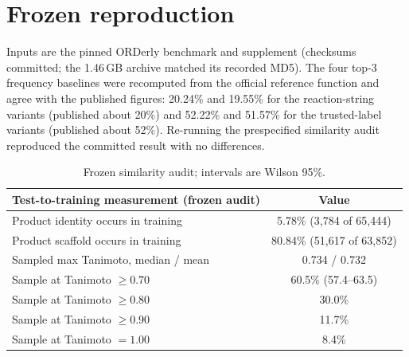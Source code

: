 \documentclass[11pt]{article}
\begin{document}
\section{Frozen reproduction}
Inputs are the pinned ORDerly benchmark and supplement (checksums committed; the 1.46\,GB archive matched its recorded MD5). The four
top-3 frequency baselines were recomputed from the official reference function and agree with the published figures:
20.24\% and 19.55\% for the reaction-string variants (published about 20\%) and 52.22\% and 51.57\% for the trusted-label
variants (published about 52\%). Re-running the prespecified similarity audit reproduced the committed result with no differences.
\begin{table}[h]
\centering\small
\begin{tabular}{lc}
\toprule
Test-to-training measurement (frozen audit) & Value\\
\midrule
Product identity occurs in training & 5.78\% (3{,}784 of 65{,}444)\\
Product scaffold occurs in training & 80.84\% (51{,}617 of 63{,}852)\\
Sampled max Tanimoto, median / mean & 0.734 / 0.732\\
Sample at Tanimoto $\ge0.70$ & 60.5\% (57.4--63.5)\\
Sample at Tanimoto $\ge0.80$ & 30.0\%\\
Sample at Tanimoto $\ge0.90$ & 11.7\%\\
Sample at Tanimoto $=1.00$ & 8.4\%\\
\bottomrule
\end{tabular}
\caption{Frozen similarity audit; intervals are Wilson 95\%.}
\end{table}
\end{document}
